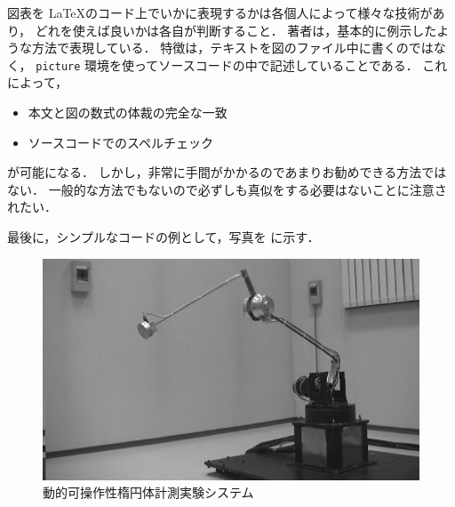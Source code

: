 図表を \LaTeX のコード上でいかに表現するかは各個人によって様々な技術があり，
どれを使えば良いかは各自が判断すること．
著者は，基本的に例示したような方法で表現している．
特徴は，テキストを図のファイル中に書くのではなく，
\texttt{picture} 環境を使ってソースコードの中で記述していることである．
これによって，
\begin{itemize}
	\item 本文と図の数式の体裁の完全な一致
	\item ソースコードでのスペルチェック
\end{itemize}
が可能になる．
しかし，非常に手間がかかるのであまりお勧めできる方法ではない．
一般的な方法でもないので必ずしも真似をする必要はないことに注意されたい．

最後に，シンプルなコードの例として，写真を  に示す．

\begin{figure}[b]
	\vspace{10mm}	%
	\begin{center}
		\includegraphics{Fig_c3/image_08.eps}
	\end{center}
	\vspace{-3mm}	%
	\caption{動的可操作性楕円体計測実験システム}													\label{fig:c3/system}
\end{figure}
